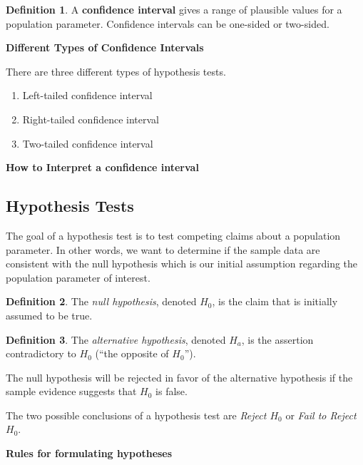 \documentclass[
  11pt,
]{book}
\theoremstyle{definition}
\newtheorem{definition}{Definition}[chapter]
\theoremstyle{definition}
\theoremstyle{definition}
\theoremstyle{definition}
\theoremstyle{remark}
\begin{document}
\begin{definition}
A \textbf{confidence interval} gives a range of plausible values for a population parameter. Confidence intervals can be one-sided or two-sided.
\end{definition}

\textbf{Different Types of Confidence Intervals}

There are three different types of hypothesis tests.

\begin{enumerate}
\def\labelenumi{\arabic{enumi}.}
\item
  Left-tailed confidence interval ~\vfill
\item
  Right-tailed confidence interval ~\vfill
\item
  Two-tailed confidence interval ~\vfill
\end{enumerate}

\textbf{How to Interpret a confidence interval}

\vfill

\newpage

\hypertarget{hypothesis-tests}{%
\subsection{Hypothesis Tests}\label{hypothesis-tests}}

The goal of a hypothesis test is to test competing claims about a population parameter. In other words, we want to determine if the sample data are consistent with the null hypothesis which is our initial assumption regarding the population parameter of interest.

\begin{definition}
The \emph{null hypothesis}, denoted \(H_0\), is the claim that is initially assumed to be true.
\end{definition}

\begin{definition}
The \emph{alternative hypothesis}, denoted \(H_a\), is the assertion contradictory to \(H_0\) (``the opposite of \(H_0\)'').
\end{definition}

The null hypothesis will be rejected in favor of the alternative hypothesis if the sample evidence suggests that \(H_0\) is false.

The two possible conclusions of a hypothesis test are \emph{Reject \(H_0\)} or \emph{Fail to Reject \(H_0\)}.

\textbf{Rules for formulating hypotheses}
\end{document}
